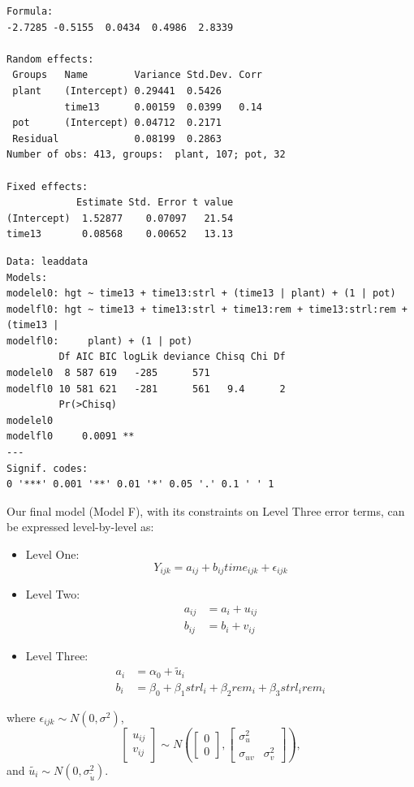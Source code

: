 \documentclass[
]{krantz}
\providecommand{\tightlist}{%
  \setlength{\itemsep}{0pt}\setlength{\parskip}{0pt}}
\begin{document}
\begin{verbatim}
Formula: 
-2.7285 -0.5155  0.0434  0.4986  2.8339 

Random effects:
 Groups   Name        Variance Std.Dev. Corr
 plant    (Intercept) 0.29441  0.5426       
          time13      0.00159  0.0399   0.14
 pot      (Intercept) 0.04712  0.2171       
 Residual             0.08199  0.2863       
Number of obs: 413, groups:  plant, 107; pot, 32

Fixed effects:
            Estimate Std. Error t value
(Intercept)  1.52877    0.07097   21.54
time13       0.08568    0.00652   13.13
\end{verbatim}

\begin{verbatim}
Data: leaddata
Models:
modelel0: hgt ~ time13 + time13:strl + (time13 | plant) + (1 | pot)
modelfl0: hgt ~ time13 + time13:strl + time13:rem + time13:strl:rem + (time13 | 
modelfl0:     plant) + (1 | pot)
         Df AIC BIC logLik deviance Chisq Chi Df
modelel0  8 587 619   -285      571             
modelfl0 10 581 621   -281      561   9.4      2
         Pr(>Chisq)   
modelel0              
modelfl0     0.0091 **
---
Signif. codes:  
0 '***' 0.001 '**' 0.01 '*' 0.05 '.' 0.1 ' ' 1
\end{verbatim}

Our final model (Model F), with its constraints on Level Three error terms, can be expressed level-by-level as:

\begin{itemize}
\tightlist
\item
  Level One:
  \begin{equation}
  Y_{ijk} = a_{ij}+b_{ij}\textstyle{time}_{ijk}+\epsilon_{ijk}
  \end{equation}
\item
  Level Two:
  \begin{align*}
  a_{ij} & = a_{i}+u_{ij} \\
  b_{ij} & = b_{i}+v_{ij}
  \end{align*}
\item
  Level Three:
  \begin{align*}
  a_{i} & = \alpha_{0} + \tilde{u}_{i} \\
  b_{i} & = \beta_{0}+\beta_{1}\textstyle{strl}_{i}+\beta_{2}\textstyle{rem}_{i} + \beta_{3}\textstyle{strl}_{i}\textstyle{rem}_{i}
  \end{align*}
\end{itemize}

where \(\epsilon_{ijk}\sim N(0,\sigma^2)\),
\[ \left[ \begin{array}{c}
            u_{ij} \\ v_{ij}
          \end{array}  \right] \sim N \left( \left[
          \begin{array}{c}
            0 \\ 0
          \end{array} \right], \left[
          \begin{array}{cc}
            \sigma_{u}^{2} & \\
            \sigma_{uv} & \sigma_{v}^{2}
          \end{array} \right] \right), \]
and \(\tilde{{u}_{i}}\sim N(0,\sigma_{\tilde{u}}^{2})\).
\end{document}
